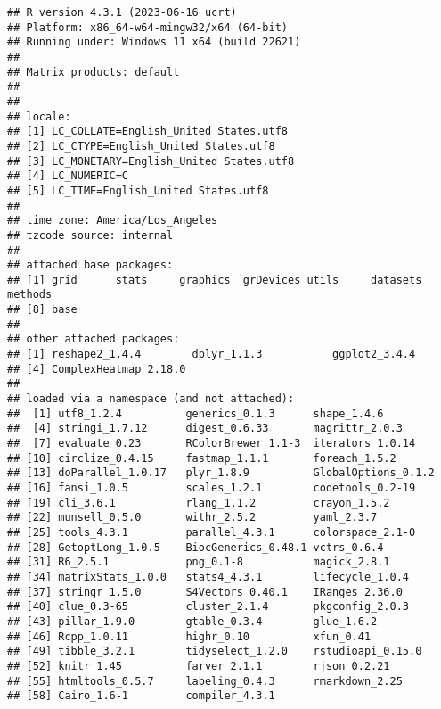 \documentclass[
]{article}
\begin{document}
\begin{verbatim}
## R version 4.3.1 (2023-06-16 ucrt)
## Platform: x86_64-w64-mingw32/x64 (64-bit)
## Running under: Windows 11 x64 (build 22621)
## 
## Matrix products: default
## 
## 
## locale:
## [1] LC_COLLATE=English_United States.utf8 
## [2] LC_CTYPE=English_United States.utf8   
## [3] LC_MONETARY=English_United States.utf8
## [4] LC_NUMERIC=C                          
## [5] LC_TIME=English_United States.utf8    
## 
## time zone: America/Los_Angeles
## tzcode source: internal
## 
## attached base packages:
## [1] grid      stats     graphics  grDevices utils     datasets  methods  
## [8] base     
## 
## other attached packages:
## [1] reshape2_1.4.4        dplyr_1.1.3           ggplot2_3.4.4        
## [4] ComplexHeatmap_2.18.0
## 
## loaded via a namespace (and not attached):
##  [1] utf8_1.2.4          generics_0.1.3      shape_1.4.6        
##  [4] stringi_1.7.12      digest_0.6.33       magrittr_2.0.3     
##  [7] evaluate_0.23       RColorBrewer_1.1-3  iterators_1.0.14   
## [10] circlize_0.4.15     fastmap_1.1.1       foreach_1.5.2      
## [13] doParallel_1.0.17   plyr_1.8.9          GlobalOptions_0.1.2
## [16] fansi_1.0.5         scales_1.2.1        codetools_0.2-19   
## [19] cli_3.6.1           rlang_1.1.2         crayon_1.5.2       
## [22] munsell_0.5.0       withr_2.5.2         yaml_2.3.7         
## [25] tools_4.3.1         parallel_4.3.1      colorspace_2.1-0   
## [28] GetoptLong_1.0.5    BiocGenerics_0.48.1 vctrs_0.6.4        
## [31] R6_2.5.1            png_0.1-8           magick_2.8.1       
## [34] matrixStats_1.0.0   stats4_4.3.1        lifecycle_1.0.4    
## [37] stringr_1.5.0       S4Vectors_0.40.1    IRanges_2.36.0     
## [40] clue_0.3-65         cluster_2.1.4       pkgconfig_2.0.3    
## [43] pillar_1.9.0        gtable_0.3.4        glue_1.6.2         
## [46] Rcpp_1.0.11         highr_0.10          xfun_0.41          
## [49] tibble_3.2.1        tidyselect_1.2.0    rstudioapi_0.15.0  
## [52] knitr_1.45          farver_2.1.1        rjson_0.2.21       
## [55] htmltools_0.5.7     labeling_0.4.3      rmarkdown_2.25     
## [58] Cairo_1.6-1         compiler_4.3.1
\end{verbatim}
\end{document}
